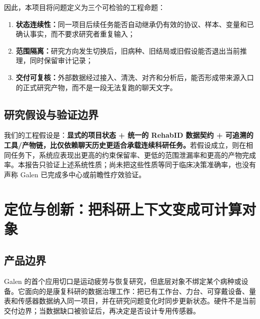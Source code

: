 \documentclass[11pt,a4paper]{article}
\begin{document}
因此，本项目将问题定义为三个可检验的工程命题：
\begin{enumerate}[leftmargin=2.1em,itemsep=3pt]
\item \textbf{状态连续性：}同一项目后续任务能否自动继承仍有效的协议、样本、变量和已确认事实，而不要求研究者重复输入；
\item \textbf{范围隔离：}研究方向发生切换后，旧病种、旧结局或旧假设能否退出当前推理，同时保留审计记录；
\item \textbf{交付可复核：}外部数据经过接入、清洗、对齐和分析后，能否形成带来源入口的正式研究产物，而不是一段无法复跑的聊天文字。
\end{enumerate}

\subsection{研究假设与验证边界}
我们的工程假设是：\textbf{显式的项目状态 + 统一的 RehabID 数据契约 + 可追溯的工具/产物链，比仅依赖聊天历史更适合承载连续科研任务。}若假设成立，则在相同任务下，系统应表现出更高的约束保留率、更低的范围泄漏率和更高的产物完成率。本报告只验证上述系统性质；尚未把这些性质等同于临床决策准确率，也没有声称 Galen 已完成多中心或前瞻性疗效验证。

\section{定位与创新：把科研上下文变成可计算对象}
\subsection{产品边界}
Galen 的首个应用切口是运动疲劳与恢复研究，但底层对象不绑定某个病种或设备。它面向的是康复科研的数据治理工作：把已有工作台、力台、可穿戴设备、量表和传感器数据纳入同一项目，并在研究问题变化时同步更新状态。硬件不是当前交付边界；当数据缺口被验证后，再决定是否设计专用传感器。
\end{document}
